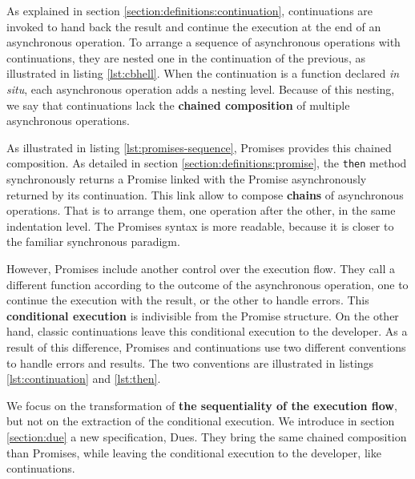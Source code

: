 As explained in section \ref{section:definitions:continuation}, continuations are invoked to hand back the result and continue the execution at the end of an asynchronous operation.
To arrange a sequence of asynchronous operations with continuations, they are nested one in the continuation of the previous, as illustrated in listing \ref{lst:cbhell}.
When the continuation is a function declared \textit{in situ}, each asynchronous operation adds a nesting level.
Because of this nesting, we say that continuations lack the \textbf{chained composition} of multiple asynchronous operations.

As illustrated in listing \ref{lst:promises-sequence}, Promises provides this chained composition.
As detailed in section \ref{section:definitions:promise}, the \texttt{then} method synchronously returns a Promise linked with the Promise asynchronously returned by its continuation.
This link allow to compose \textbf{chains} of asynchronous operations.
That is to arrange them, one operation after the other, in the same indentation level.
The Promises syntax is more readable, because it is closer to the familiar synchronous paradigm.

However, Promises include another control over the execution flow.
They call a different function according to the outcome of the asynchronous operation, one to continue the execution with the result, or the other to handle errors.
This \textbf{conditional execution} is indivisible from the Promise structure.
On the other hand, classic continuations leave this conditional execution to the developer.
As a result of this difference, Promises and continuations use two different conventions to handle errors and results.
The two conventions are illustrated in listings \ref{lst:continuation} and \ref{lst:then}.

We focus on the transformation of \textbf{the sequentiality of the execution flow}, but not on the extraction of the conditional execution.
We introduce in section \ref{section:due} a new specification, Dues.
They bring the same chained composition than Promises, while leaving the conditional execution to the developer, like continuations.




